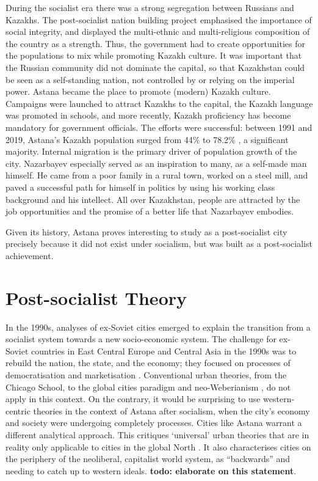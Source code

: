 \documentclass{article}
\begin{document}
During the socialist era there was a strong segregation between Russians and Kazakhs. The post-socialist nation building project emphasised the importance of social integrity, and displayed the multi-ethnic and multi-religious composition of the country as a strength. Thus, the government had to create opportunities for the populations to mix while promoting Kazakh culture. It was important that the Russian community did not dominate the capital, so that Kazakhstan could be seen as a self-standing nation, not controlled by or relying on the imperial power. 
Astana became the place to promote (modern) Kazakh culture. Campaigns were launched to attract Kazakhs to the capital, the Kazakh language was promoted in schools, and more recently, Kazakh proficiency has become mandatory for government officials. The efforts were successful: between 1991 and 2019, Astana's Kazakh population surged from 44\% to 78.2\% \parencite{unfpa2020wekazakhstan}, a significant majority. 
Internal migration is the primary driver of population growth of the city. Nazarbayev especially served as an inspiration to many, as a self-made man himself. He came from a poor family in a rural town, worked on a steel mill, and paved a successful path for himself in politics by using his working class background and his intellect. All over Kazakhstan, people are attracted by the job opportunities and the promise of a better life that Nazarbayev embodies.

Given its history, Astana proves interesting to study as a post-socialist city precisely because it did not exist under socialism, but was built as a post-socialist achievement.

\section{Post-socialist Theory}

In the 1990s, analyses of ex-Soviet cities emerged to explain the transition from a socialist system towards a new socio-economic system. The challenge for ex-Soviet countries in East Central Europe and Central Asia in the 1990s was to rebuild the nation, the state, and the economy; they focused on processes of democratisation and marketisation \parencite{ferenvcuhova2016introduction}. Conventional urban theories, from the Chicago School, to the global cities paradigm and neo-Weberianism \parencite{haussermann2005european}, do not apply in this context.
On the contrary, it would be surprising to use western-centric theories in the context of Astana after socialism, when the city's economy and society were undergoing completely processes. Cities like Astana warrant a different analytical approach. This critiques `universal' urban theories that are in reality only applicable to cities in the global North \parencite{ferenvcuhova2016accounts} \parencite{robinson2013ordinary}. It also characterises cities on the periphery of the neoliberal, capitalist world system, as ``backwards'' and needing to catch up to western ideals. \textbf{todo: elaborate on this statement}.
\end{document}
